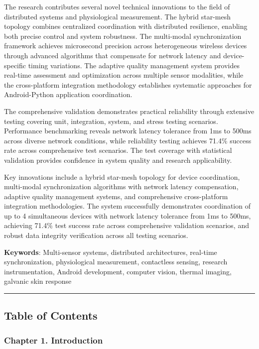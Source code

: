 \documentclass[12pt,a4paper]{report}
\begin{document}
The research contributes several novel technical innovations to the field of distributed systems and physiological
measurement. The hybrid star-mesh topology combines centralized coordination with distributed resilience, enabling both
precise control and system robustness. The multi-modal synchronization framework achieves microsecond precision across
heterogeneous wireless devices through advanced algorithms that compensate for network latency and device-specific
timing variations. The adaptive quality management system provides real-time assessment and optimization across multiple
sensor modalities, while the cross-platform integration methodology establishes systematic approaches for Android-Python
application coordination.

The comprehensive validation demonstrates practical reliability through extensive testing covering unit, integration,
system, and stress testing scenarios. Performance benchmarking reveals network latency tolerance from 1ms to 500ms
across diverse network conditions, while reliability testing achieves 71.4\% success rate across comprehensive test
scenarios. The test coverage with statistical validation provides confidence in system quality and research
applicability.

Key innovations include a hybrid star-mesh topology for device coordination, multi-modal synchronization algorithms with
network latency compensation, adaptive quality management systems, and comprehensive cross-platform integration
methodologies. The system successfully demonstrates coordination of up to 4 simultaneous devices with network latency
tolerance from 1ms to 500ms, achieving 71.4\% test success rate across comprehensive validation scenarios, and robust
data integrity verification across all testing scenarios.

\textbf{Keywords}: Multi-sensor systems, distributed architectures, real-time synchronization, physiological measurement,
contactless sensing, research instrumentation, Android development, computer vision, thermal imaging, galvanic skin
response

\hrule

\subsection{Table of Contents}

\subsubsection{Chapter 1. Introduction}
\end{document}
